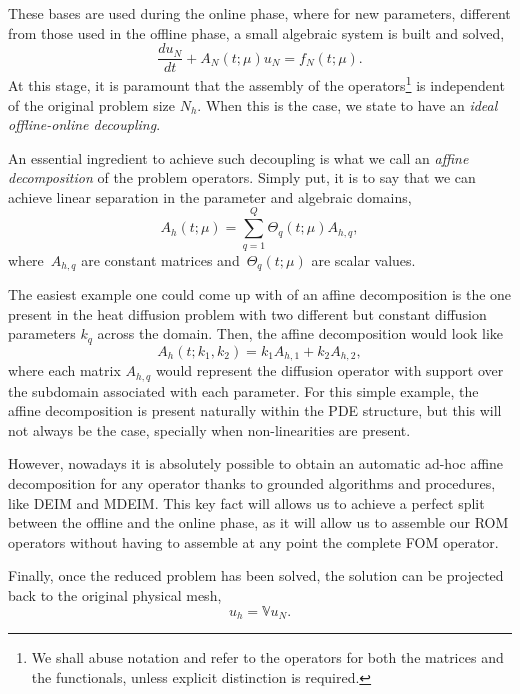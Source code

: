 \documentclass[a4paper, technote, compsoc]{IEEEtran}
\begin{document}
These bases are used during the online phase, where for new parameters, different from those used in the offline phase, a small algebraic system is built and solved,
\begin{equation*}
   \frac{du_N}{dt} + A_N\left(t;\mu\right) u_N = f_N\left(t;\mu\right).
\end{equation*}
At this stage, it is paramount that the assembly of the operators\footnote{
   We shall abuse notation and refer to the operators for both the matrices and the functionals, unless explicit distinction is required.
} 
is independent of the original problem size $N_h$.
When this is the case, we state to have an \textit{
   ideal offline-online decoupling}.

An essential ingredient to achieve such decoupling is what we call an \textit{
   affine decomposition} 
of the problem operators.
Simply put, it is to say that we can achieve linear separation in the parameter and algebraic domains, 
\begin{equation*}
   A_h\left(t;\mu\right) = \sum_{q=1}^{Q} \Theta_{q}(t;\mu) A_{h,q},
\end{equation*}
where~$A_{h,q}$ are constant matrices and~$\Theta_{q}(t;\mu)$ are scalar values. 

The easiest example one could come up with of an affine decomposition is the one present in the heat diffusion problem with two different but constant diffusion parameters $k_q$ across the domain.
Then, the affine decomposition would look like
\begin{equation*}
   A_h\left(t;k_1, k_2\right) = k_{1} A_{h,1} + k_{2} A_{h,2},
\end{equation*}
where each matrix $A_{h,q}$ would represent the diffusion operator with support over the subdomain associated with each parameter. 
For this simple example, the affine decomposition is present naturally within the PDE structure, but this will not always be the case, specially when non-linearities are present. 

However, nowadays it is absolutely possible to obtain an automatic ad-hoc affine decomposition for any operator thanks to grounded algorithms and procedures, like DEIM and MDEIM.
This key fact will allows us to achieve a perfect split between the offline and the online phase, as it will allow us to assemble our ROM operators without having to assemble at any point the complete FOM operator. 

Finally, once the reduced problem has been solved, the solution can be projected back to the original physical mesh,
\begin{equation*}
   u_h = \mathbb{V} u_N.
\end{equation*}
\end{document}
